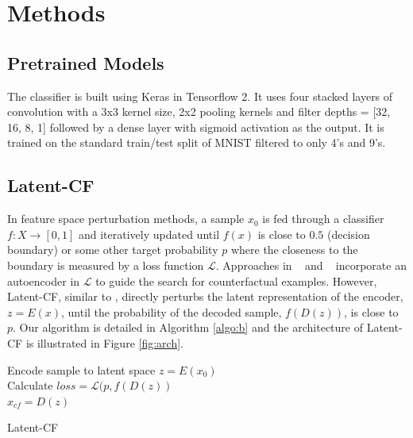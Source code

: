 \documentclass[letterpaper]{article} %
\begin{document}
\section{Methods}
\subsection{Pretrained Models}\label{sec:models}


The classifier is built using Keras in Tensorflow 2. It uses four stacked layers of convolution with a 3x3 kernel size, 2x2 pooling kernels and filter depths = [32, 16, 8, 1] followed by a dense layer with sigmoid activation as the output.  It is trained on the standard train/test split of MNIST filtered to only 4's and 9's.

\subsection{Latent-CF}

In feature space perturbation methods, a sample $x_0$ is fed through a classifier $f: X \rightarrow [0,1]$ and iteratively updated until $f(x)$ is close to $0.5$ (decision boundary) or some other target probability $p$ where the closeness to the boundary is measured by a loss function $\mathcal{L}$. 
Approaches in ~\cite{looveren2019interpretable} and ~\cite{dhurandhar2018} incorporate an autoencoder  in $\mathcal{L}$ to guide the search for counterfactual examples. However, 
Latent-CF, similar to \cite{joshi2019realistic}, directly perturbs the latent representation of the encoder, $z = E(x)$, until the probability of the decoded sample, $f(D(z))$, is close to $p$. Our algorithm is detailed in Algorithm \ref{algo:b} and the architecture of Latent-CF is illustrated in Figure \ref{fig:arch}.
\begin{algorithm}
Encode sample to latent space $z = E(x_0)$ \\
Calculate $loss = \mathcal{L}(p, f(D(z))$\\
$x_{cf} = D(z)$
\caption{Latent-CF}
\label{algo:b}
\end{algorithm}
\end{document}
